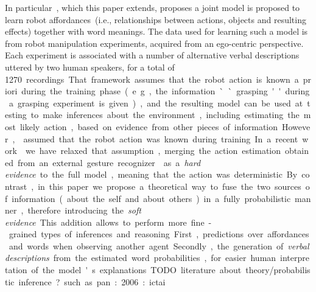 In particular~\cite{salvi:2012:smcb}, which this paper extends, proposes a joint model is proposed to learn robot affordances~(i.e., relationships between actions, objects and resulting effects) together with word meanings.
The data used for learning such a model is from robot manipulation experiments, acquired from an ego-centric perspective.
Each experiment is associated with a number of alternative verbal descriptions uttered by two human speakers, for a total of \SI{1270}~recordings.
That framework assumes that the robot action is known a~priori during the training phase~(e.g., the information ``grasping'' during a grasping experiment is given), and the resulting model can be used at testing to make inferences about the environment, including estimating the most likely action, based on evidence from other pieces of information.
However,~\cite{salvi:2012:smcb} assumed that the robot action was known during training.
In a recent work~\cite{saponaro:2017:glu} we have relaxed that assumption, merging the action estimation obtained from an external gesture recognizer~\cite{saponaro:2013:crhri} as a \emph{hard evidence} to the full model, meaning that the action was deterministic.
By contrast, in this paper we propose a theoretical way to fuse the two sources of information~(about the self and about others) in a fully probabilistic manner, therefore introducing the \emph{soft evidence}.
This addition allows to perform more fine-grained types of inferences and reasoning.%
First, predictions over affordances and words when observing another agent.
Secondly, the generation of \emph{verbal descriptions} from the estimated word probabilities, for easier human interpretation of the model's explanations.

TODO literature about theory/probabilistic inference? such as pan:2006:ictai \cite{pan:2006:ictai}



